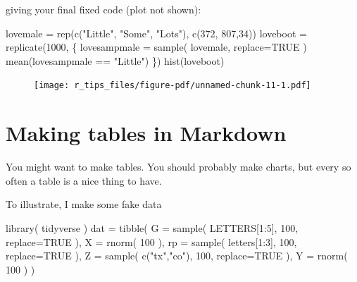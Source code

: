 \documentclass[
  letterpaper,
  DIV=11,
  numbers=noendperiod]{scrreprt}
\newenvironment{Shaded}{\begin{snugshade}}{\end{snugshade}}
\newcommand{\AttributeTok}[1]{\textcolor[rgb]{0.49,0.56,0.16}{#1}}
\newcommand{\ConstantTok}[1]{\textcolor[rgb]{0.53,0.00,0.00}{#1}}
\newcommand{\DecValTok}[1]{\textcolor[rgb]{0.25,0.63,0.44}{#1}}
\newcommand{\FunctionTok}[1]{\textcolor[rgb]{0.02,0.16,0.49}{#1}}
\newcommand{\NormalTok}[1]{\textcolor[rgb]{0.00,0.44,0.13}{#1}}
\newcommand{\OtherTok}[1]{\textcolor[rgb]{0.00,0.44,0.13}{#1}}
\newcommand{\SpecialCharTok}[1]{\textcolor[rgb]{0.25,0.44,0.63}{#1}}
\newcommand{\StringTok}[1]{\textcolor[rgb]{0.25,0.44,0.63}{#1}}
\begin{document}
giving your final fixed code (plot not shown):

\begin{Shaded}
\begin{Highlighting}[]
\NormalTok{lovemale }\OtherTok{=} \FunctionTok{rep}\NormalTok{(}\FunctionTok{c}\NormalTok{(}\StringTok{"Little"}\NormalTok{, }\StringTok{"Some"}\NormalTok{, }\StringTok{"Lots"}\NormalTok{), }\FunctionTok{c}\NormalTok{(}\DecValTok{372}\NormalTok{, }\DecValTok{807}\NormalTok{,}\DecValTok{34}\NormalTok{))}
\NormalTok{loveboot }\OtherTok{=} \FunctionTok{replicate}\NormalTok{(}\DecValTok{1000}\NormalTok{, \{}
\NormalTok{  lovesampmale }\OtherTok{=} \FunctionTok{sample}\NormalTok{( lovemale, }\AttributeTok{replace=}\ConstantTok{TRUE}\NormalTok{ )}
  \FunctionTok{mean}\NormalTok{(lovesampmale }\SpecialCharTok{==} \StringTok{"Little"}\NormalTok{)}
\NormalTok{\})}
\FunctionTok{hist}\NormalTok{(loveboot)}
\end{Highlighting}
\end{Shaded}

\begin{figure}[H]

{\centering \texttt{[image: r\_tips\_files/figure-pdf/unnamed-chunk-11-1.pdf]}

}

\end{figure}

\hypertarget{making-tables-in-markdown}{%
\chapter{Making tables in Markdown}\label{making-tables-in-markdown}}

You might want to make tables. You should probably make charts, but
every so often a table is a nice thing to have.

To illustrate, I make some fake data

\begin{Shaded}
\begin{Highlighting}[]
\FunctionTok{library}\NormalTok{( tidyverse )}
\NormalTok{dat }\OtherTok{=} \FunctionTok{tibble}\NormalTok{( }\AttributeTok{G =} \FunctionTok{sample}\NormalTok{( LETTERS[}\DecValTok{1}\SpecialCharTok{:}\DecValTok{5}\NormalTok{], }\DecValTok{100}\NormalTok{, }\AttributeTok{replace=}\ConstantTok{TRUE}\NormalTok{ ),}
              \AttributeTok{X =} \FunctionTok{rnorm}\NormalTok{( }\DecValTok{100}\NormalTok{ ),}
              \AttributeTok{rp =} \FunctionTok{sample}\NormalTok{( letters[}\DecValTok{1}\SpecialCharTok{:}\DecValTok{3}\NormalTok{], }\DecValTok{100}\NormalTok{, }\AttributeTok{replace=}\ConstantTok{TRUE}\NormalTok{ ),}
              \AttributeTok{Z =} \FunctionTok{sample}\NormalTok{( }\FunctionTok{c}\NormalTok{(}\StringTok{"tx"}\NormalTok{,}\StringTok{"co"}\NormalTok{), }\DecValTok{100}\NormalTok{, }\AttributeTok{replace=}\ConstantTok{TRUE}\NormalTok{ ),}
              \AttributeTok{Y =} \FunctionTok{rnorm}\NormalTok{( }\DecValTok{100}\NormalTok{ ) )}
\end{Highlighting}
\end{Shaded}
\end{document}
